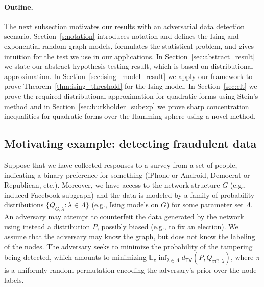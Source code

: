 \documentclass[final,12pt]{colt2018}
\begin{document}
\paragraph{Outline.} The next subsection motivates our results with an adversarial data detection scenario. Section~\ref{s:notation} introduces notation and defines the Ising and exponential random graph models, formulates the statistical problem, and gives intuition for the test we use in our applications.
In Section~\ref{sec:abstract_result} we state our abstract hypothesis testing result, which is based on distributional approximation.
In Section~\ref{sec:ising_model_result} we apply our framework to prove Theorem~\ref{thm:ising_threshold} for the Ising model. 
In Section~\ref{sec:clt} we prove the required distributional approximation for quadratic forms using Stein's method and in Section~\ref{sec:burkholder_subexp} we prove sharp concentration inequalities for quadratic forms over the Hamming sphere using a novel method. 



\subsection{Motivating example: detecting fraudulent data}
\label{subsec:adversary_model}
Suppose that we have collected responses to a survey from a set of people, indicating a binary preference for something (iPhone or Android, Democrat or Republican, etc.). Moreover, we have access to the network structure $G$ (e.g., induced Facebook subgraph) and the data is modeled by a family of probability distributions $\{Q_{G,\lambda}: \lambda \in \Lambda\}$ (e.g., Ising models on $G$) for some parameter set $\Lambda$.  An adversary may attempt to counterfeit the data generated by the network using instead a distribution $P$, possibly biased (e.g., to fix an election). We assume that the adversary may know the graph, but does not know the labeling of the nodes. The adversary seeks to minimize the probability of the tampering being detected, which amounts to minimizing $\mathbb{E}_\pi  \inf_{\lambda\in \Lambda} d_{\mathsf{TV}}(P, Q_{\pi G,\lambda})$, where $\pi$ is a uniformly random permutation encoding the adversary's prior over the node labels. 
\end{document}
